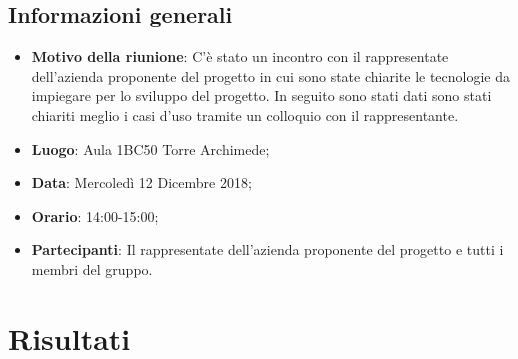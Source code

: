 \documentclass{article}
\begin{document}
    \subsection{Informazioni generali}
    \begin{itemize}
        \item \textbf{Motivo della riunione}: C'è stato un incontro con il rappresentate dell'azienda proponente del progetto in cui sono state chiarite le tecnologie da impiegare per lo sviluppo del progetto. In seguito sono stati dati sono stati chiariti meglio i casi d'uso tramite un colloquio con il rappresentante.
        \item \textbf{Luogo}: Aula 1BC50 Torre Archimede;
        \item \textbf{Data}: Mercoledì 12 Dicembre 2018;
        \item \textbf{Orario}: 14:00-15:00;
        \item \textbf{Partecipanti}: Il rappresentate dell'azienda proponente del progetto e tutti i membri del gruppo.
    \end{itemize}
    \newpage
    
\section{Risultati}
\end{document}
